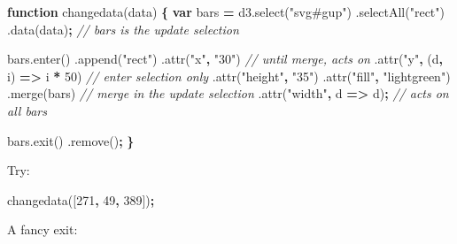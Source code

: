 \documentclass[openany]{book}
\newenvironment{Shaded}{\begin{snugshade}}{\end{snugshade}}
\newcommand{\AttributeTok}[1]{\textcolor[rgb]{0.77,0.63,0.00}{#1}}
\newcommand{\CommentTok}[1]{\textcolor[rgb]{0.56,0.35,0.01}{\textit{#1}}}
\newcommand{\DecValTok}[1]{\textcolor[rgb]{0.00,0.00,0.81}{#1}}
\newcommand{\KeywordTok}[1]{\textcolor[rgb]{0.13,0.29,0.53}{\textbf{#1}}}
\newcommand{\NormalTok}[1]{#1}
\newcommand{\OperatorTok}[1]{\textcolor[rgb]{0.81,0.36,0.00}{\textbf{#1}}}
\newcommand{\StringTok}[1]{\textcolor[rgb]{0.31,0.60,0.02}{#1}}
\newcommand{\VariableTok}[1]{\textcolor[rgb]{0.00,0.00,0.00}{#1}}
\begin{document}
\begin{Shaded}
\begin{Highlighting}[]
\KeywordTok{function} \AttributeTok{changedata}\NormalTok{(data) }\OperatorTok{\{}
  \KeywordTok{var}\NormalTok{ bars }\OperatorTok{=} \VariableTok{d3}\NormalTok{.}\AttributeTok{select}\NormalTok{(}\StringTok{"svg#gup"}\NormalTok{) }
\NormalTok{    .}\AttributeTok{selectAll}\NormalTok{(}\StringTok{"rect"}\NormalTok{)}
\NormalTok{    .}\AttributeTok{data}\NormalTok{(data)}\OperatorTok{;}    \CommentTok{// bars is the update selection}
    
  \VariableTok{bars}\NormalTok{.}\AttributeTok{enter}\NormalTok{()}
\NormalTok{    .}\AttributeTok{append}\NormalTok{(}\StringTok{"rect"}\NormalTok{)}
\NormalTok{      .}\AttributeTok{attr}\NormalTok{(}\StringTok{"x"}\OperatorTok{,} \StringTok{"30"}\NormalTok{)  }\CommentTok{// until merge, acts on}
\NormalTok{      .}\AttributeTok{attr}\NormalTok{(}\StringTok{"y"}\OperatorTok{,}\NormalTok{ (d}\OperatorTok{,}\NormalTok{ i) }\OperatorTok{=>}\NormalTok{ i }\OperatorTok{*} \DecValTok{50}\NormalTok{) }\CommentTok{// enter selection only}
\NormalTok{      .}\AttributeTok{attr}\NormalTok{(}\StringTok{"height"}\OperatorTok{,} \StringTok{"35"}\NormalTok{)  }
\NormalTok{      .}\AttributeTok{attr}\NormalTok{(}\StringTok{"fill"}\OperatorTok{,} \StringTok{"lightgreen"}\NormalTok{)}
\NormalTok{    .}\AttributeTok{merge}\NormalTok{(bars) }\CommentTok{// merge in the update selection}
\NormalTok{      .}\AttributeTok{attr}\NormalTok{(}\StringTok{"width"}\OperatorTok{,}\NormalTok{ d }\OperatorTok{=>}\NormalTok{ d)}\OperatorTok{;} \CommentTok{// acts on all bars}
      
  \VariableTok{bars}\NormalTok{.}\AttributeTok{exit}\NormalTok{()}
\NormalTok{    .}\AttributeTok{remove}\NormalTok{()}\OperatorTok{;}
  \OperatorTok{\}}
\end{Highlighting}
\end{Shaded}

Try:

\begin{Shaded}
\begin{Highlighting}[]
\AttributeTok{changedata}\NormalTok{([}\DecValTok{271}\OperatorTok{,} \DecValTok{49}\OperatorTok{,} \DecValTok{389}\NormalTok{])}\OperatorTok{;}
\end{Highlighting}
\end{Shaded}

A fancy exit:
\end{document}

